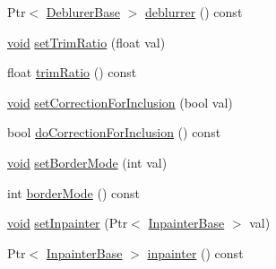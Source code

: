 \begin{DoxyCompactItemize}
\item 
Ptr$<$ \hyperlink{classcv_1_1videostab_1_1DeblurerBase}{Deblurer\-Base} $>$ \hyperlink{classcv_1_1videostab_1_1StabilizerBase_a86037f36b313917aeecb3dda73d50be4}{deblurrer} () const 
\item 
\hyperlink{legacy_8hpp_a8bb47f092d473522721002c86c13b94e}{void} \hyperlink{classcv_1_1videostab_1_1StabilizerBase_aac98667cf80a45d764e883b5a02ae152}{set\-Trim\-Ratio} (float val)
\item 
float \hyperlink{classcv_1_1videostab_1_1StabilizerBase_a62d47f14a9cd677a06eea513a6c4fb70}{trim\-Ratio} () const 
\item 
\hyperlink{legacy_8hpp_a8bb47f092d473522721002c86c13b94e}{void} \hyperlink{classcv_1_1videostab_1_1StabilizerBase_ada19bffb5b015f14af92e7c472989605}{set\-Correction\-For\-Inclusion} (bool val)
\item 
bool \hyperlink{classcv_1_1videostab_1_1StabilizerBase_a4094363493904896862653e403f8ea51}{do\-Correction\-For\-Inclusion} () const 
\item 
\hyperlink{legacy_8hpp_a8bb47f092d473522721002c86c13b94e}{void} \hyperlink{classcv_1_1videostab_1_1StabilizerBase_a5c2b79352223792a044080dfd365b30b}{set\-Border\-Mode} (int val)
\item 
int \hyperlink{classcv_1_1videostab_1_1StabilizerBase_ae922497c29e15bfdd6d6e0501ba9f3f0}{border\-Mode} () const 
\item 
\hyperlink{legacy_8hpp_a8bb47f092d473522721002c86c13b94e}{void} \hyperlink{classcv_1_1videostab_1_1StabilizerBase_add20a4cf58f541dbafcaa290a3c35f16}{set\-Inpainter} (Ptr$<$ \hyperlink{classcv_1_1videostab_1_1InpainterBase}{Inpainter\-Base} $>$ val)
\item 
Ptr$<$ \hyperlink{classcv_1_1videostab_1_1InpainterBase}{Inpainter\-Base} $>$ \hyperlink{classcv_1_1videostab_1_1StabilizerBase_a0f2416a759064e3b52d0fa46ccf13ce0}{inpainter} () const 
\end{DoxyCompactItemize}
